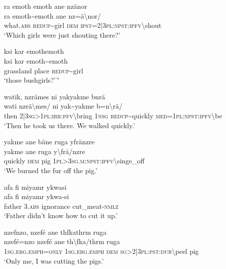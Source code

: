 \ea\label{ex:12:a772}
ra emoth emoth ane nzänor\\
\gll ra	emoth{\textasciitilde}emoth	ane	nz=ä{\textbackslash}nor/\\
     what.\textsc{abs}	\textsc{redup}{\textasciitilde}girl	\textsc{dem}	\textsc{ipst}=2|3\textsc{pl}:\textsc{npst}:\textsc{ipfv}{\textbackslash}shout\\
\glt `Which girls were just shouting there?'
\z

\ea\label{ex:12:a773}
ksi kar emothemoth\\
\gll ksi	kar	emoth{\textasciitilde}emoth\\
     grassland	place	\textsc{redup}{\textasciitilde}girl\\
\glt `those bushgirls?'''
\z

\ea\label{ex:12:a774}
watik, nzrämes ni yakyakme bnrä\\
\gll wati	nzrä{\textbackslash}mes/	ni	yak{\textasciitilde}yakme	b=n{\textbackslash}rä/\\
     then	2|3\textsc{sg}>1\textsc{pl}:\textsc{irr}:\textsc{pfv}{\textbackslash}bring	1\textsc{nsg}	\textsc{redup}{\textasciitilde}quickly	\textsc{med}=1\textsc{pl}:\textsc{npst}:\textsc{ipfv}{\textbackslash}be\\
\glt `Then he took us there. We walked quickly.'
\z

\ea\label{ex:12:a776}
yakme ane bäne ruga yfränzre\\
\gll yakme	ane	ruga	y{\textbackslash}frä/nzre\\
     quickly	\textsc{dem}	pig	1\textsc{pl}>3\textsc{sg}.\textsc{m}:\textsc{npst}:\textsc{ipfv}{\textbackslash}singe\_off\\
\glt `We burned the fur off the pig.'
\z

\ea\label{ex:12:a778}
afa fi miyamr ykwasi\\
\gll afa	fi	miyamr	ykwa-si\\
     father	3.\textsc{abs}	ignorance	cut\_meat-\textsc{nmlz}\\
\glt `Father didn't know how to cut it up.'
\z

\ea\label{ex:12:a780}
nzefnzo, nzefé ane thfkathrm ruga\\
\gll nzefé=nzo	nzefé	ane	th{\textbackslash}fka/thrm	ruga\\
     1\textsc{sg}.\textsc{erg}.\textsc{emph}=\textsc{only}	1\textsc{sg}.\textsc{erg}.\textsc{emph}	\textsc{dem}	\textsc{sg}>2|3\textsc{pl}:\textsc{pst}:\textsc{dur}{\textbackslash}peel	pig\\
\glt `Only me, I was cutting the pigs.'
\z

